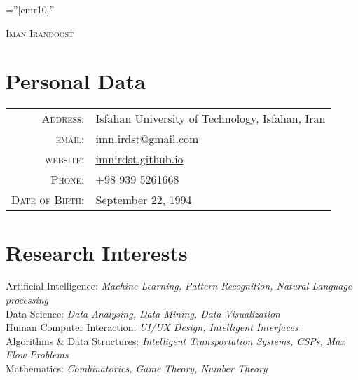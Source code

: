 \documentclass[a4paper,10pt]{article}
\begin{document}
	
	
	\pagestyle{empty} %
	
	\font\fb=''[cmr10]'' %
	
	\par{\centering
		{\Huge \textsc{Iman Irandoost}
		}\bigskip\par}
	
	\section{Personal Data}
	\begin{tabular}{rl}
		\textsc{Address:}   & Isfahan University of Technology, Isfahan, Iran \\
		\textsc{email:}     & \href{mailto:imn.irdst@gmail.com}{imn.irdst@gmail.com}\\
		\textsc{website:}     & \href{https://imnirdst.github.io/}{imnirdst.github.io}\\
		\textsc{Phone:}     & +98 939 5261668\\
		\textsc{Date of Birth:} & September 22, 1994
	\end{tabular}
	
	\section{Research Interests}
		\textbullet\textnormal{ Artificial Intelligence:}  \emph{\color{darkgray}\small Machine Learning, Pattern Recognition, Natural Language processing} \vspace{2 mm}  \\
		\textbullet\textnormal{ Data Science:} \emph{\color{darkgray}\small Data Analysing, Data Mining, Data Visualization} \vspace{2 mm} \\
		\textbullet\textnormal{ Human Computer Interaction:} \emph{\color{darkgray}\small UI/UX Design, Intelligent Interfaces} \vspace{2 mm} \\
		\textbullet\textnormal{ Algorithms \& Data Structures:} \emph{\color{darkgray}\small Intelligent Transportation Systems, CSPs, Max Flow Problems} \vspace{2 mm} \\
		\textbullet\textnormal{ Mathematics:} \emph{\color{darkgray}\small Combinatorics, Game Theory, Number Theory}
\end{document}
